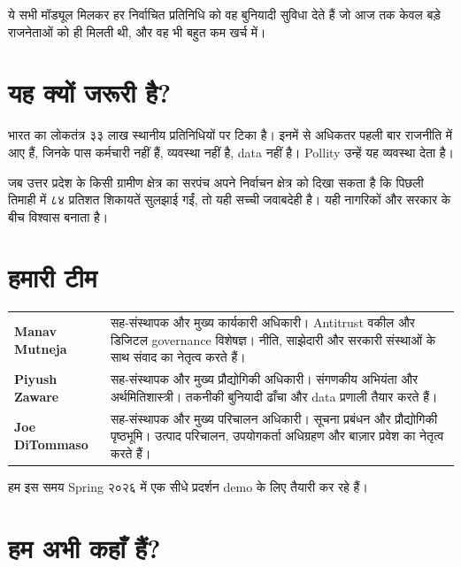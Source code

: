 \documentclass[11pt, a4paper]{article}
\begin{document}
\vspace{0.5em}
ये सभी मॉड्यूल मिलकर हर निर्वाचित प्रतिनिधि को वह बुनियादी सुविधा देते हैं जो आज तक केवल बड़े राजनेताओं को ही मिलती थी, और वह भी बहुत कम खर्च में।

\section{यह क्यों जरूरी है?}

भारत का लोकतंत्र ३३ लाख स्थानीय प्रतिनिधियों पर टिका है। इनमें से अधिकतर पहली बार राजनीति में आए हैं, जिनके पास कर्मचारी नहीं हैं, व्यवस्था नहीं है, \textenglish{data} नहीं है। \textenglish{Pollity} उन्हें यह व्यवस्था देता है।

जब उत्तर प्रदेश के किसी ग्रामीण क्षेत्र का सरपंच अपने निर्वाचन क्षेत्र को दिखा सकता है कि पिछली तिमाही में ८४ प्रतिशत शिकायतें सुलझाई गईं, तो यही सच्ची जवाबदेही है। यही नागरिकों और सरकार के बीच विश्वास बनाता है।

\section{हमारी टीम}

\begin{tabularx}{\linewidth}{lX}
\toprule
\textbf{\textenglish{Manav Mutneja}} & सह-संस्थापक और मुख्य कार्यकारी अधिकारी। \textenglish{Antitrust} वकील और डिजिटल \textenglish{governance} विशेषज्ञ। नीति, साझेदारी और सरकारी संस्थाओं के साथ संवाद का नेतृत्व करते हैं। \\[4pt]
\textbf{\textenglish{Piyush Zaware}} & सह-संस्थापक और मुख्य प्रौद्योगिकी अधिकारी। संगणकीय अभियंता और अर्थमितिशास्त्री। तकनीकी बुनियादी ढाँचा और \textenglish{data} प्रणाली तैयार करते हैं। \\[4pt]
\textbf{\textenglish{Joe DiTommaso}} & सह-संस्थापक और मुख्य परिचालन अधिकारी। सूचना प्रबंधन और प्रौद्योगिकी पृष्ठभूमि। उत्पाद परिचालन, उपयोगकर्ता अधिग्रहण और बाज़ार प्रवेश का नेतृत्व करते हैं। \\
\bottomrule
\end{tabularx}

\vspace{0.5em}
हम इस समय \textenglish{Spring} २०२६ में एक सीधे प्रदर्शन \textenglish{demo} के लिए तैयारी कर रहे हैं।

\section{हम अभी कहाँ हैं?}
\end{document}
